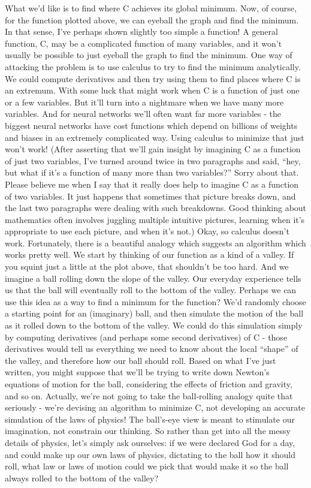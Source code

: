 What we'd like is to find where C achieves its global minimum. Now, of course, for the function plotted above, we can eyeball the graph and find the minimum. In that sense, I've perhaps shown slightly too simple a function! A general function, C, may be a complicated function of many variables, and it won't usually be possible to just eyeball the graph to find the minimum.
One way of attacking the problem is to use calculus to try to find the minimum analytically. We could compute derivatives and then try using them to find places where C is an extremum. With some luck that might work when C is a function of just one or a few variables. But it'll turn into a nightmare when we have many more variables. And for neural networks we'll often want far more variables - the biggest neural networks have cost functions which depend on billions of weights and biases in an extremely complicated way. Using calculus to minimize that just won't work!
(After asserting that we'll gain insight by imagining C as a function of just two variables, I've turned around twice in two paragraphs and said, ``hey, but what if it's a function of many more than two variables?'' Sorry about that. Please believe me when I say that it really does help to imagine C as a function of two variables. It just happens that sometimes that picture breaks down, and the last two paragraphs were dealing with such breakdowns. Good thinking about mathematics often involves juggling multiple intuitive pictures, learning when it's appropriate to use each picture, and when it's not.)
Okay, so calculus doesn't work. Fortunately, there is a beautiful analogy which suggests an algorithm which works pretty well. We start by thinking of our function as a kind of a valley. If you squint just a little at the plot above, that shouldn't be too hard. And we imagine a ball rolling down the slope of the valley. Our everyday experience tells us that the ball will eventually roll to the bottom of the valley. Perhaps we can use this idea as a way to find a minimum for the function? We'd randomly choose a starting point for an (imaginary) ball, and then simulate the motion of the ball as it rolled down to the bottom of the valley. We could do this simulation simply by computing derivatives (and perhaps some second derivatives) of C - those derivatives would tell us everything we need to know about the local ``shape'' of the valley, and therefore how our ball should roll.
Based on what I've just written, you might suppose that we'll be trying to write down Newton's equations of motion for the ball, considering the effects of friction and gravity, and so on. Actually, we're not going to take the ball-rolling analogy quite that seriously - we're devising an algorithm to minimize C, not developing an accurate simulation of the laws of physics! The ball's-eye view is meant to stimulate our imagination, not constrain our thinking. So rather than get into all the messy details of physics, let's simply ask ourselves: if we were declared God for a day, and could make up our own laws of physics, dictating to the ball how it should roll, what law or laws of motion could we pick that would make it so the ball always rolled to the bottom of the valley?
